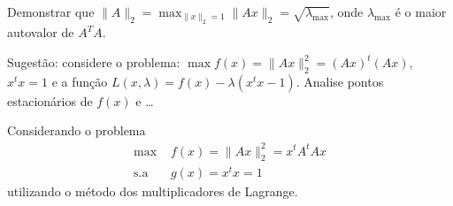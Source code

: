 \documentclass[a4paper,12pt, leqno, answers]{exam}
\newcommand{\mdot}{\bullet}
\begin{document}
\begin{questions}

     Demonstrar que $\| A \|_2 = \max_{\| x \|_2 = 1} \| A x \|_2 = \sqrt{\lambda_\text{max}}$, onde $\lambda_\text{max}$ \'{e} o maior autovalor de $A^T A$.
    
    Sugest\~{a}o: considere o problema: $\max f(x) = \| A x \|_2^2 = \left( A x \right)^t \left( A x \right)$, $x^t x = 1$ e a fun\c{c}\~{a}o $L(x, \lambda) = f(x) - \lambda \left( x^t x - 1 \right)$. Analise pontos estacion\'{a}rios de $f(x)$ e \dots
    \begin{solution}
        Considerando o problema
        \begin{align*}
            \text{max } & f(x) = \| A x \|_2^2 = x^t A^t A x \\
            \text{s.a } & g(x) = x^t x = 1
        \end{align*}
        utilizando o m\'{e}todo dos multiplicadores de Lagrange.


\end{solution}
\end{questions}
\end{document}

